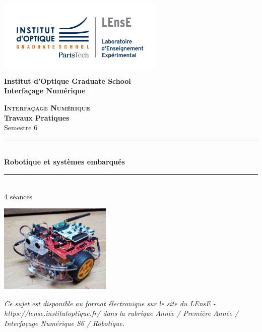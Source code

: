 \documentclass[a4paper,11pt,titlepage]{article} %
\begin{document}
\begin{titlepage}

\begin{center}
	\begin{minipage}{2.5cm}
	\begin{center}
		\includegraphics[width=8cm]{images/Logo-LEnsE.png}
	\end{center}
\end{minipage}\hfill
\begin{minipage}{10cm}
	\begin{center}
	\textbf{Institut d'Optique Graduate School }\\[0.1cm]
    \textbf{Interfaçage Numérique}


	\end{center}
\end{minipage}\hfill


\vspace{4cm}


{\huge \bfseries \textsc{Interfaçage Numérique}} \\[0.5cm]
{\large \bfseries Travaux Pratiques} \\[0.2cm]
Semestre 6

\vspace{2cm}
\rule{\linewidth}{0.3mm} \\[0.4cm]
{ \huge \bfseries\color{violet_iogs} Robotique et systèmes embarqués\\[0.4cm] }
\rule{\linewidth}{0.3mm} \\[1cm]

4 séances

\bigskip

\begin{center}
	\includegraphics[width=0.4\textwidth]{images/robot_joycar.jpg}
\end{center}

\vfill

\textit{Ce sujet est disponible au format électronique sur le site du LEnsE - https://lense.institutoptique.fr/ dans la rubrique Année / Première Année / Interfaçage Numérique S6 / Robotique.}


\end{center}
\end{titlepage}
\end{document}
